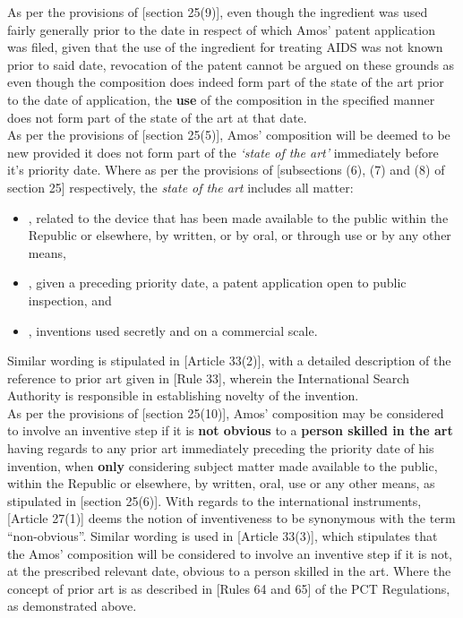 \documentclass[11pt]{article}
\begin{document}
As per the provisions of [section 25(9)]\cite{rsa78_patents_act}, even though the ingredient was used fairly generally prior to the
date in respect of which Amos' patent application was filed, given that the use of the ingredient for treating AIDS was not
known prior to said date, revocation of the patent cannot be argued on these grounds as even though the composition does indeed
form part of the state of the art prior to the date of application, the \textbf{use} of the composition in the specified manner does not
form part of the state of the art at that date.\\

As per the provisions of [section 25(5)]\cite{rsa78_patents_act}, Amos' composition will be deemed to be new provided it does not
form part of the \emph{`state of the art'} immediately before it's priority date. Where as per the provisions of [subsections (6), (7)
and (8) of section 25]\cite{rsa78_patents_act} respectively, the \emph{state of the art} includes all matter:
\begin{itemize}
\item\relax [subsection (6)], related to the device that has been made available to the public within the Republic or elsewhere, by written, or by oral, or through use or by any other means,
\item\relax [subsection (7)], given a preceding priority date, a patent application open to public inspection, and
\item\relax [subsection (8)], inventions used secretly and on a commercial scale.
\end{itemize}

Similar wording is stipulated in [Article 33(2)]\cite{wipo70_pct}, with a detailed description of the reference to prior art given in [Rule 33]\cite{wipo70_pct_reg}, wherein the International Search Authority is responsible in establishing novelty of the invention.\\

As per the provisions of [section 25(10)]\cite{rsa78_patents_act}, Amos' composition may be considered to involve an inventive step
if it is \textbf{not obvious} to a \textbf{person skilled in the art} having regards to any prior art immediately preceding the priority date of
his invention, when \textbf{only} considering subject matter made available to the public, within the Republic or elsewhere, by written,
oral, use or any other means, as stipulated in [section 25(6)]\cite{rsa78_patents_act}. With regards to the international
instruments, [Article 27(1)]\cite{wto17_trips} deems the notion of inventiveness to be synonymous with the term ``non-obvious''.
Similar wording is used in [Article 33(3)]\cite{wipo70_pct}, which stipulates that the Amos' composition will be considered to
involve an inventive step if it is not, at the prescribed relevant date, obvious to a person skilled in the art. Where the concept
of prior art is as described in [Rules 64 and 65]\cite{wipo70_pct_reg} of the PCT Regulations, as demonstrated above.\\
\end{document}
